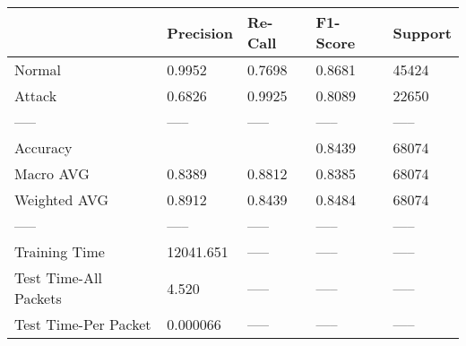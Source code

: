 \begin{tabular}{lllll}
\toprule
{} &  Precision & Re-Call & F1-Score & Support \\
\midrule
Normal                &     0.9952 &  0.7698 &   0.8681 &   45424 \\
Attack                &     0.6826 &  0.9925 &   0.8089 &   22650 \\
-----                 &      ----- &   ----- &    ----- &   ----- \\
Accuracy              &            &         &   0.8439 &   68074 \\
Macro AVG             &     0.8389 &  0.8812 &   0.8385 &   68074 \\
Weighted AVG          &     0.8912 &  0.8439 &   0.8484 &   68074 \\
-----                 &      ----- &   ----- &    ----- &   ----- \\
Training Time         &  12041.651 &   ----- &    ----- &   ----- \\
Test Time-All Packets &      4.520 &   ----- &    ----- &   ----- \\
Test Time-Per Packet  &   0.000066 &   ----- &    ----- &   ----- \\
\bottomrule
\end{tabular}
